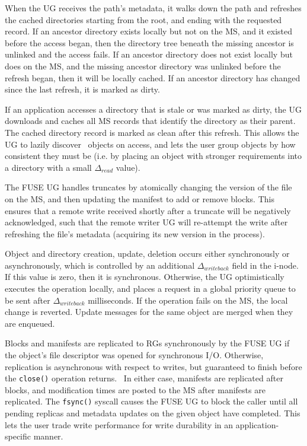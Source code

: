 When the UG receives the path's metadata, it walks down the path and refreshes the cached directories starting from the root, and ending with the requested record. If an ancestor directory exists locally but not on the MS, and it existed before the access began, then the directory tree beneath the missing ancestor is unlinked and the access fails. If an ancestor directory does not exist locally but does on the MS, and the missing ancestor directory was unlinked before the refresh began, then it will be locally cached. If an ancestor directory has changed since the last refresh, it is marked as dirty.

If an application accesses a directory that is stale or was marked as dirty, the UG downloads and caches all MS records that identify the directory as their parent. The cached directory record is marked as clean after this refresh. This allows the UG to lazily discover \Syndicate\ objects on access, and lets the user group objects by how consistent they must be (i.e. by placing an object with stronger requirements into a directory with a small $\Delta_{read}$ value).

The FUSE UG handles truncates by atomically changing the version of the file on the MS, and then updating the manifest to add or remove blocks. This ensures that a remote write received shortly after a truncate will be negatively acknowledged, such that the remote writer UG will re-attempt the write after refreshing the file's metadata (acquiring its new version in the process).

Object and directory creation, update, deletion occurs either synchronously or asynchronously, which is controlled by an additional $\Delta_{writeback}$ field in the i-node. If this value is zero, then it is synchronous. Otherwise, the UG optimistically executes the operation locally, and places a request in a global priority queue to be sent after $\Delta_{writeback}$ milliseconds. If the operation fails on the MS, the local change is reverted. Update messages for the same object are merged when they are enqueued.

Blocks and manifests are replicated to RGs synchronously by the FUSE UG if the object's file descriptor was opened for synchronous I/O. Otherwise, replication is asynchronous with respect to writes, but guaranteed to finish before the \texttt{close()} operation returns.  In either case, manifests are replicated after blocks, and modification times are posted to the MS after manifests are replicated. The \texttt{fsync()} syscall causes the FUSE UG to block the caller until all pending replicas and metadata updates on the given object have completed. This lets the user trade write performance for write durability in an application-specific manner.


